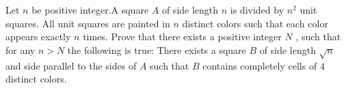 Let $n$ be positive integer.A square $A$ of side length $n$ is divided by $n^2$ unit squares. All unit squares are painted in $n$ distinct colors such that each color appears exactly $n$ times. Prove that there exists a positive integer $N$ , such that for any $n>N$ the following is true: There exists a square $B$ of side length $\sqrt{n}$ and side parallel to the sides of $A$ such that $B$ contains completely cells of $4$ distinct colors.